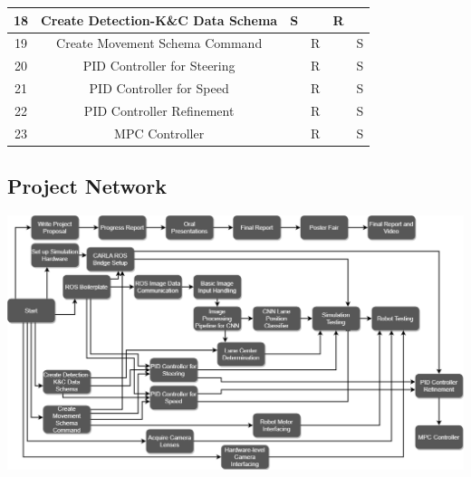 \documentclass[titlepage]{article}
\begin{document}
\begin{center}
\begin{tabular}{|c | c | c | c | c | c |}
		\hline
		18   & Create Detection-K\&C Data Schema & S      &      & R   &        \\
		\hline
		19   & Create Movement Schema Command    &        & R    &     & S      \\
		\hline
		20   & PID Controller for Steering       &        & R    &     & S      \\
		\hline
		21   & PID Controller for Speed          &        & R    &     & S      \\
		\hline
		22   & PID Controller Refinement         &        & R    &     & S      \\
		\hline
		23   & MPC Controller                    &        & R    &     & S      \\
		\hline
	\end{tabular}
\end{center}

\subsection{Project Network}
\includegraphics[width=10in,scale=1, angle=90, origin=c]{activity.png}
\end{document}
